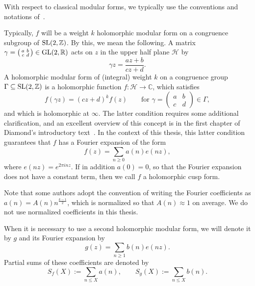 With respect to classical modular forms, we typically use the conventions and notations
of~\cite{Bump98, Goldfeld2006automorphic}.


Typically, $f$ will be a weight $k$ holomorphic modular form on a congruence subgroup of
$\operatorname{SL}(2, \mathbb{Z})$.
By this, we mean the following.
A matrix $\gamma = \left(\begin{smallmatrix} a&b \\ c&d \end{smallmatrix}\right) \in
\operatorname{GL}(2, \mathbb{R})$ acts on $z$ in the upper half plane $\mathcal{H}$ by
\begin{equation}
  \gamma z = \frac{az + b}{cz + d}.
\end{equation}
A holomorphic modular form of (integral) weight $k$ on a congruence group
$\Gamma \subseteq \operatorname{SL}(2, \mathbb{Z})$ is a holomorphic function
$f: \mathcal{H} \longrightarrow \mathbb{C}$, which satisfies
\begin{equation}\label{eq:back:full_integer_law}
  f(\gamma z) = (cz+d)^k f(z) \qquad \text{for } \gamma =
  \left(\begin{smallmatrix} a&b \\ c&d \end{smallmatrix}\right) \in \Gamma,
\end{equation}
and which is holomorphic at $\infty$.
The latter condition requires some additional clarification, and an excellent overview of
this concept is in the first chapter of Diamond's introductory
text~\cite{diamondfirstcourse}.
In the context of this thesis, this latter condition guarantees that $f$ has a Fourier
expansion of the form
\begin{equation}
  f(z) = \sum_{n \geq 0} a(n) e(nz),
\end{equation}
where $e(nz) = e^{2\pi i n z}$.
If in addition $a(0) = 0$, so that the Fourier expansion does not have a constant term,
then we call $f$ a holomorphic cusp form.


Note that some authors adopt the convention of writing the Fourier coefficients as $a(n) =
A(n) n^{\frac{k-1}{2}}$, which is normalized so that $A(n) \approx 1$ on average.
We do not use normalized coefficients in this thesis.


When it is necessary to use a second holomorphic modular form, we will denote it by $g$
and its Fourier expansion by
\begin{equation}
  g(z) = \sum_{n \geq 1} b(n) e(nz).
\end{equation}
Partial sums of these coefficients are denoted by
\begin{equation}
  S_f(X) := \sum_{n \leq X} a(n), \qquad S_g(X) := \sum_{n \leq X} b(n).
\end{equation}


